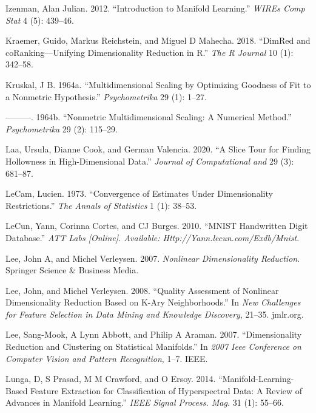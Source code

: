 \documentclass[12pt]{article}
\newlength{\cslhangindent}
\newenvironment{cslreferences}%
  {\setlength{\parindent}{0pt}%
  \everypar{\setlength{\hangindent}{\cslhangindent}}\ignorespaces}%
  {\par}
\begin{document}
\begin{cslreferences}
\leavevmode\hypertarget{ref-Izenman2012-mx}{}%
Izenman, Alan Julian. 2012. ``Introduction to Manifold Learning.'' \emph{WIREs Comp Stat} 4 (5): 439--46.

\leavevmode\hypertarget{ref-Kraemer2018-zf}{}%
Kraemer, Guido, Markus Reichstein, and Miguel D Mahecha. 2018. ``DimRed and coRanking---Unifying Dimensionality Reduction in R.'' \emph{The R Journal} 10 (1): 342--58.

\leavevmode\hypertarget{ref-Kruskal1964a}{}%
Kruskal, J B. 1964a. ``Multidimensional Scaling by Optimizing Goodness of Fit to a Nonmetric Hypothesis.'' \emph{Psychometrika} 29 (1): 1--27.

\leavevmode\hypertarget{ref-Kruskal1964b}{}%
---------. 1964b. ``Nonmetric Multidimensional Scaling: A Numerical Method.'' \emph{Psychometrika} 29 (2): 115--29.

\leavevmode\hypertarget{ref-Laa2020}{}%
Laa, Ursula, Dianne Cook, and German Valencia. 2020. ``A Slice Tour for Finding Hollowness in High-Dimensional Data.'' \emph{Journal of Computational and} 29 (3): 681--87.

\leavevmode\hypertarget{ref-lecam1973}{}%
LeCam, Lucien. 1973. ``Convergence of Estimates Under Dimensionality Restrictions.'' \emph{The Annals of Statistics} 1 (1): 38--53.

\leavevmode\hypertarget{ref-lecun2010mnist}{}%
LeCun, Yann, Corinna Cortes, and CJ Burges. 2010. ``MNIST Handwritten Digit Database.'' \emph{ATT Labs {[}Online{]}. Available: Http://Yann.lecun.com/Exdb/Mnist}.

\leavevmode\hypertarget{ref-Lee2007-wq}{}%
Lee, John A, and Michel Verleysen. 2007. \emph{Nonlinear Dimensionality Reduction}. Springer Science \& Business Media.

\leavevmode\hypertarget{ref-Lee2008-cx}{}%
Lee, John, and Michel Verleysen. 2008. ``Quality Assessment of Nonlinear Dimensionality Reduction Based on K-Ary Neighborhoods.'' In \emph{New Challenges for Feature Selection in Data Mining and Knowledge Discovery}, 21--35. jmlr.org.

\leavevmode\hypertarget{ref-lee2007}{}%
Lee, Sang-Mook, A Lynn Abbott, and Philip A Araman. 2007. ``Dimensionality Reduction and Clustering on Statistical Manifolds.'' In \emph{2007 Ieee Conference on Computer Vision and Pattern Recognition}, 1--7. IEEE.

\leavevmode\hypertarget{ref-Lunga2014-kc}{}%
Lunga, D, S Prasad, M M Crawford, and O Ersoy. 2014. ``Manifold-Learning-Based Feature Extraction for Classification of Hyperspectral Data: A Review of Advances in Manifold Learning.'' \emph{IEEE Signal Process. Mag.} 31 (1): 55--66.


\end{cslreferences}
\end{document}
